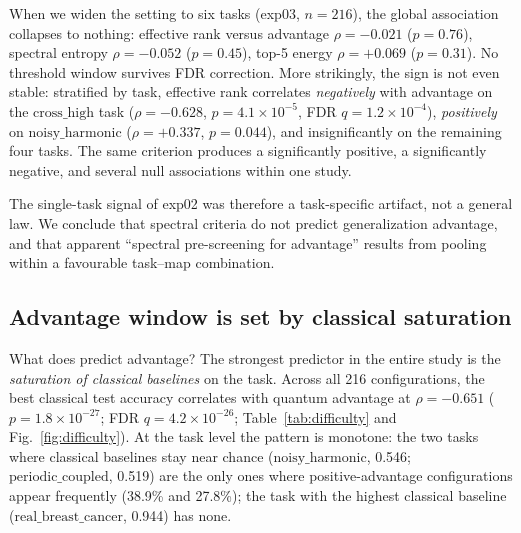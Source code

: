 \documentclass[a4paper,unpublished,onecolumn,nopdfoutputerror,12pt]{quantumarticle}
\begin{document}
When we widen the setting to six tasks (exp03, $n=216$), the global association
collapses to nothing: effective rank versus advantage $\rho=-0.021$ ($p=0.76$), spectral
entropy $\rho=-0.052$ ($p=0.45$), top-5 energy $\rho=+0.069$ ($p=0.31$). No threshold
window survives FDR correction. More strikingly, the sign is not even stable: stratified
by task, effective rank correlates \emph{negatively} with advantage on the
$\mathrm{cross\_high}$ task ($\rho=-0.628$, $p=4.1\times10^{-5}$, FDR $q=1.2\times10^{-4}$),
\emph{positively} on $\mathrm{noisy\_harmonic}$ ($\rho=+0.337$, $p=0.044$), and
insignificantly on the remaining four tasks. The same criterion produces a significantly
positive, a significantly negative, and several null associations within one study.

The single-task signal of exp02 was therefore a task-specific artifact, not a general
law. We conclude that spectral criteria do not predict generalization advantage, and
that apparent ``spectral pre-screening for advantage'' results from pooling within a
favourable task--map combination.

\subsection{Advantage window is set by classical saturation}
\label{sec:difficulty}

What does predict advantage? The strongest predictor in the entire study is the
\emph{saturation of classical baselines} on the task. Across all 216 configurations,
the best classical test accuracy correlates with quantum advantage at $\rho=-0.651$
($p=1.8\times10^{-27}$; FDR $q=4.2\times10^{-26}$; Table~\ref{tab:difficulty} and
Fig.~\ref{fig:difficulty}). At the task level the pattern is monotone: the two tasks
where classical baselines stay near chance ($\mathrm{noisy\_harmonic}$, 0.546;
$\mathrm{periodic\_coupled}$, 0.519) are the only ones where positive-advantage
configurations appear frequently (38.9\% and 27.8\%); the task with the highest classical
baseline ($\mathrm{real\_breast\_cancer}$, 0.944) has none.
\end{document}
